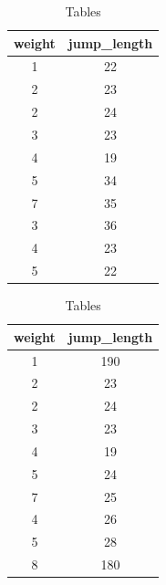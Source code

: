 \documentclass[
  letterpaper,
]{scrbook}
\begin{document}
\begin{table}

\caption{\label{tbl-tables}Tables}\begin{minipage}[t]{0.50\linewidth}

{\centering 

\begin{tabular}[t]{cc}
\toprule
weight & jump\_length\\
\midrule
1 & 22\\
2 & 23\\
2 & 24\\
3 & 23\\
4 & 19\\
5 & 34\\
7 & 35\\
3 & 36\\
4 & 23\\
5 & 22\\
\bottomrule
\end{tabular}

}

\end{minipage}%
%
\begin{minipage}[t]{0.50\linewidth}

{\centering 

\begin{tabular}[t]{cc}
\toprule
weight & jump\_length\\
\midrule
1 & 190\\
2 & 23\\
2 & 24\\
3 & 23\\
4 & 19\\
5 & 24\\
7 & 25\\
4 & 26\\
5 & 28\\
8 & 180\\
\bottomrule
\end{tabular}

}

\end{minipage}%

\end{table}
\end{document}
